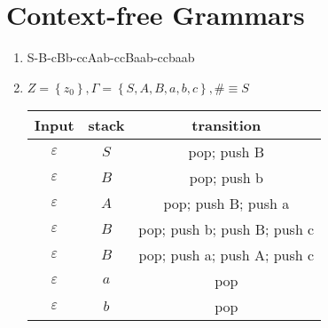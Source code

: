 \documentclass[sectionformat=exercise]{gadsescript}
\begin{document}
\section{Context-free Grammars}
\begin{enumerate}[label=\alph*)]
	\item S-B-cBb-ccAab-ccBaab-ccbaab
	\item $ Z = \left\{ z_0 \right\} , \Gamma = \left\{ S, A, B, a, b, c \right\}, \# \equiv S $\\
		\begin{tabular}{|c|c|c|}
			\hline
			Input & stack & transition \\\hline
			\hline
			$ \varepsilon  $ & $ S $ & pop; push B \\\hline
			$ \varepsilon  $ & $ B $ & pop; push b \\\hline
			$ \varepsilon  $ & $ A $ & pop; push B; push a\\\hline
			$ \varepsilon  $ & $ B $ & pop; push b; push B; push c\\\hline
			$ \varepsilon  $ & $ B $ & pop; push a; push A; push c\\\hline
			\hline
			$ \varepsilon  $ & $ a $ & pop \\\hline
			$ \varepsilon  $ & $ b $ & pop \\\hline
		\end{tabular}
\end{enumerate}
\end{document}
